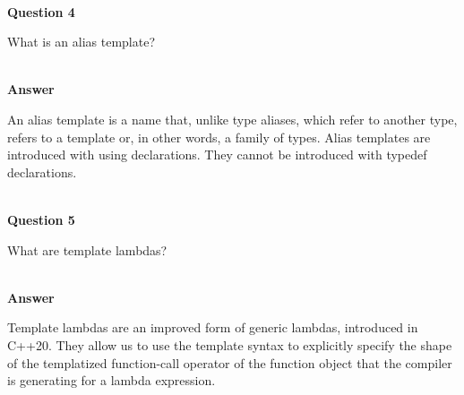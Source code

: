 \hspace*{\fill} \\ %
\noindent
\textbf{Question 4}

What is an alias template?

\hspace*{\fill} \\ %
\noindent
\textbf{Answer}

An alias template is a name that, unlike type aliases, which refer to another type, refers to a template or, in other words, a family of types. Alias templates are introduced with using declarations. They cannot be introduced with typedef declarations.

\hspace*{\fill} \\ %
\noindent
\textbf{Question 5}

What are template lambdas?

\hspace*{\fill} \\ %
\noindent
\textbf{Answer}

Template lambdas are an improved form of generic lambdas, introduced in C++20. They allow us to use the template syntax to explicitly specify the shape of the templatized function-call operator of the function object that the compiler is generating for a lambda expression.












